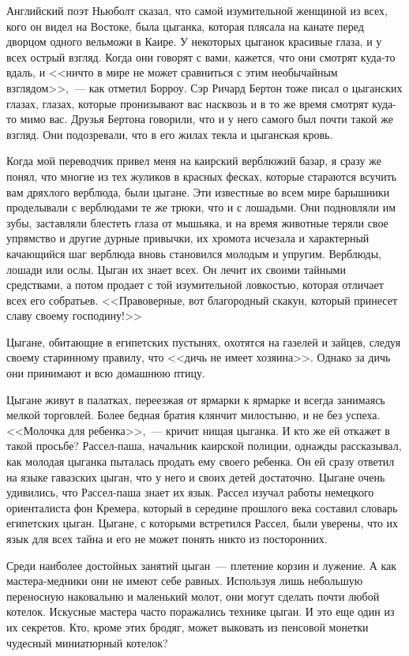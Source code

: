 \documentclass[12pt,a4paper,twoside,openany,svgnames]{memoir}
\begin{document}
Английский поэт Ньюболт сказал, что самой изумительной женщиной из всех, кого он видел на Востоке, была цыганка, которая плясала на канате перед дворцом одного вельможи в Каире. У некоторых цыганок красивые глаза, и у всех острый взгляд. Когда они говорят с вами, кажется, что они смотрят куда-то вдаль, и <<ничто в мире не может сравниться с этим необычайным взглядом>>,~--- как отметил Борроу. Сэр Ричард Бертон тоже писал о цыганских глазах, глазах, которые пронизывают вас насквозь и в то же время смотрят куда-то мимо вас. Друзья Бертона говорили, что и у него самого был почти такой же взгляд. Они подозревали, что в его жилах текла и цыганская кровь.

Когда мой переводчик привел меня на каирский верблюжий базар, я сразу же понял, что многие из тех жуликов в красных фесках, которые стараются всучить вам дряхлого верблюда, были цыгане. Эти известные во всем мире барышники проделывали с верблюдами те же трюки, что и с лошадьми. Они подновляли им зубы, заставляли блестеть глаза от мышьяка, и на время животные теряли свое упрямство и другие дурные привычки, их хромота исчезала и характерный качающийся шаг верблюда вновь становился молодым и упругим. Верблюды, лошади или ослы. Цыган их знает всех. Он лечит их своими тайными средствами, а потом продает с той изумительной ловкостью, которая отличает всех его собратьев. <<Правоверные, вот благородный скакун, который принесет славу своему господину!>>

Цыгане, обитающие в египетских пустынях, охотятся на газелей и зайцев, следуя своему старинному правилу, что <<дичь не имеет хозяина>>. Однако за дичь они принимают и всю домашнюю птицу.

Цыгане живут в палатках, переезжая от ярмарки к ярмарке и всегда занимаясь мелкой торговлей. Более бедная братия клянчит милостыню, и не без успеха. <<Молочка для ребенка>>,~--- кричит нищая цыганка. И кто же ей откажет в такой просьбе? Рассел-паша, начальник каирской полиции, однажды рассказывал, как молодая цыганка пыталась продать ему своего ребенка. Он ей сразу ответил на языке гавазских цыган, что у него и своих детей достаточно. Цыгане очень удивились, что Рассел-паша знает их язык. Рассел изучал работы немецкого ориенталиста фон Кремера, который в середине прошлого века составил словарь египетских цыган. Цыгане, с которыми встретился Рассел, были уверены, что их язык для всех тайна и его не может понять никто из посторонних.

Среди наиболее достойных занятий цыган~--- плетение корзин и лужение. А как мастера-медники они не имеют себе равных. Используя лишь небольшую переносную наковальню и маленький молот, они могут сделать почти любой котелок. Искусные мастера часто поражались технике цыган. И это еще один из их секретов. Кто, кроме этих бродяг, может выковать из пенсовой монетки чудесный миниатюрный котелок?
\end{document}
